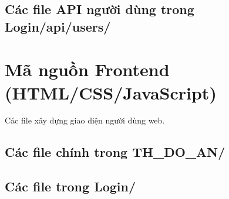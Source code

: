 \subsection{Các file API người dùng trong Login/api/users/}

\section{Mã nguồn Frontend (HTML/CSS/JavaScript)}
Các file xây dựng giao diện người dùng web.
\subsection{Các file chính trong TH\_DO\_AN/}

\subsection{Các file trong Login/}

%  

% 